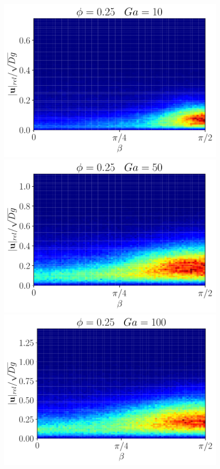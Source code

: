 \begin{figure}[h!]
    \includegraphics[scale = 0.9,height = \size]{image/N_10/beta/2DMAP_beta_v_rel_dmin_10_Bo1PHI0_25mu_r0_42Ga10.pdf}
    \includegraphics[scale = 0.9,height = \size]{image/N_10/beta/2DMAP_beta_v_rel_dmin_10_Bo1PHI0_25mu_r0_42Ga50.pdf}
    \includegraphics[scale = 0.9,height = \size]{image/N_10/beta/2DMAP_beta_v_rel_dmin_10_Bo1PHI0_25mu_r0_42Ga100.pdf}

\end{figure}
